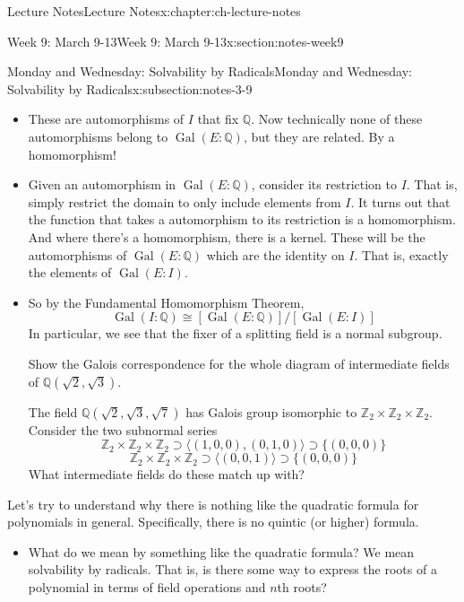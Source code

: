 \documentclass[oneside,11pt,]{book}
\begin{document}
\begin{chapterptx}{Lecture Notes}{}{Lecture Notes}{}{}{x:chapter:ch-lecture-notes}
\begin{sectionptx}{Week 9: March 9-13}{}{Week 9: March 9-13}{}{}{x:section:notes-week9}
\begin{subsectionptx}{Monday and Wednesday: Solvability by Radicals}{}{Monday and Wednesday: Solvability by Radicals}{}{}{x:subsection:notes-3-9}
\begin{itemize}[label=\textbullet]
\item{}These are automorphisms of \(I\) that fix \(\mathbb Q\). Now technically none of these automorphisms belong to \(\mathop{\mathrm{Gal}}(E:\mathbb Q)\), but they are related. By a homomorphism!%
\item{}Given an automorphism in \(\mathop{\mathrm{Gal}}(E:\mathbb Q)\), consider its restriction to \(I\). That is, simply restrict the domain to only include elements from \(I\). It turns out that the function that takes a automorphism to its restriction is a homomorphism. And where there’s a homomorphism, there is a kernel. These will be the automorphisms of \(\mathop{\mathrm{Gal}}(E:\mathbb Q)\) which are the identity on \(I\). That is, exactly the elements of \(\mathop{\mathrm{Gal}}(E:I)\).%
\item{}So by the Fundamental Homomorphism Theorem,%
\begin{equation*}
\mathop{\mathrm{Gal}}(I:\mathbb Q) \cong [\mathop{\mathrm{Gal}}(E:\mathbb Q)]/[\mathop{\mathrm{Gal}}(E:I)]
\end{equation*}
In particular, we see that the fixer of a splitting field is a normal subgroup.%
\par
Show the Galois correspondence for the whole diagram of intermediate fields of \(\mathbb Q(\sqrt{2},\sqrt{3})\).%
\par
The field \(\mathbb Q(\sqrt{2},\sqrt{3}, \sqrt{7})\) has Galois group isomorphic to \(\mathbb Z_2\times\mathbb Z_2\times\mathbb Z_2\). Consider the two subnormal series%
\begin{equation*}
\mathbb Z_2\times\mathbb Z_2\times\mathbb Z_2 \supset \langle (1,0,0), (0,1,0)\rangle \supset \{(0,0,0)\}
\end{equation*}
%
\begin{equation*}
\mathbb Z_2\times\mathbb Z_2\times\mathbb Z_2 \supset \langle (0,0,1)\rangle \supset \{(0,0,0)\}
\end{equation*}
What intermediate fields do these match up with?%
\end{itemize}
%
\par
Let's try to understand why there is nothing like the quadratic formula for polynomials in general. Specifically, there is no quintic (or higher) formula.%
\par
%
\begin{itemize}[label=\textbullet]
\item{}What do we mean by something like the quadratic formula? We mean solvability by radicals. That is, is there some way to express the roots of a polynomial in terms of field operations and \(n\)th roots?%

\end{itemize}
\end{subsectionptx}
\end{sectionptx}
\end{chapterptx}
\end{document}

